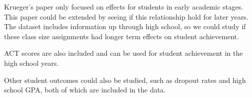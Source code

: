 \documentclass[a4paper,11pt]{article}
\begin{document}
Krueger's paper only focused on effects for students in early academic stages. This paper could be extended by seeing if this relationship hold for later years. The dataset includes information up through high school, so we could study if these class size assignments had longer term effects on student achievement. \par

ACT scores are also included and can be used for student achievement in the high school years. \par

Other student outcomes could also be studied, such as dropout rates and high school GPA, both of which are included in the data. 
\end{document}
